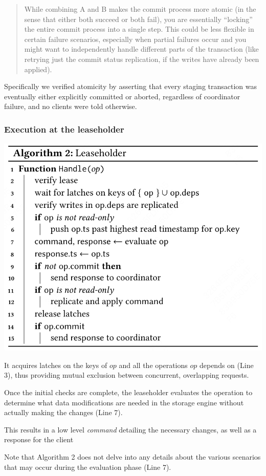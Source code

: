 \documentclass[11pt]{article}
\begin{document}
\begin{quote}
While combining A and B makes the commit process more atomic (in the sense that either both succeed or both fail), you are essentially ``locking'' the entire commit process into a single step. This could be less flexible in certain failure scenarios, especially when partial failures occur and you might want to independently handle different parts of the transaction (like retrying just the commit status replication, if the writes have already been applied).
\end{quote}

Specifically we verified atomicity by asserting that every staging transaction was eventually either
explicitly committed or aborted, regardless of coordinator failure, and no clients were told
otherwise.
\subsubsection{Execution at the leaseholder}
\label{sec:orgeb02d3d}
\begin{center}
\includegraphics[width=.7\textwidth]{../../images/papers/70.png}
\label{}
\end{center}
It acquires latches on the keys of \(op\) and all the operations \(op\) depends on (Line 3), thus providing
mutual exclusion between concurrent, overlapping requests.

Once the initial checks are complete, the leaseholder evaluates the operation to determine what data
modifications are needed in the storage engine without actually making the changes (Line 7).

This results in a low level \emph{command} detailing the necessary changes, as well as a response for the
client

Note that Algorithm 2 does not delve into any details about the various scenarios that may occur
during the evaluation phase (Line 7).
\end{document}
